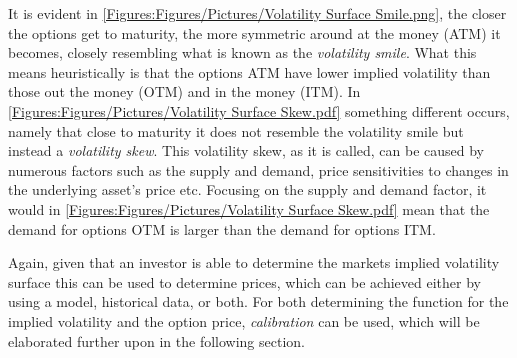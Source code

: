 
It is evident in \autoref{Figures:Figures/Pictures/Volatility Surface Smile.png}, the closer the options get to maturity, the more symmetric around at the money (ATM) it becomes, closely resembling what is known as the \emph{volatility smile}. What this means heuristically is that the options ATM have lower implied volatility than those out the money (OTM) and in the money (ITM). In \autoref{Figures:Figures/Pictures/Volatility Surface Skew.pdf} something different occurs, namely that close to maturity it does not resemble the volatility smile but instead a \emph{volatility skew}. This volatility skew, as it is called, can be caused by numerous factors such as the supply and demand, price sensitivities to changes in the underlying asset's price etc. Focusing on the supply and demand factor, it would in \autoref{Figures:Figures/Pictures/Volatility Surface Skew.pdf} mean that the demand for options OTM is larger than the demand for options ITM.

Again, given that an investor is able to determine the markets implied volatility surface this can be used to determine prices, which can be achieved either by using a model, historical data, or both. For both determining the function for the implied volatility and the option price, \emph{calibration} can be used, which will be elaborated further upon in the following section.



